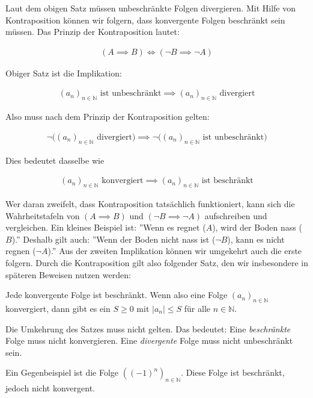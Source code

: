 \documentclass[fontsize=9pt,
               parskip=half-,
               DIV=14,
               listof=chapterentry,
               tocflat]{scrbook}
\begin{document}
Laut dem obigen Satz müssen unbeschränkte Folgen divergieren. Mit Hilfe von Kontraposition können wir folgern, dass konvergente Folgen beschränkt sein müssen. Das Prinzip der Kontraposition lautet:

\begin{align*}
(A\implies B)\iff (\neg B\implies \neg A)
\end{align*}

Obiger Satz ist die Implikation:

\begin{align*}
(a_{n})_{n\in \mathbb {N} }{\text{ ist unbeschränkt}}\implies (a_{n})_{n\in \mathbb {N} }{\text{ divergiert}}
\end{align*}

Also muss nach dem Prinzip der Kontraposition gelten:

\begin{align*}
\neg {\big (}(a_{n})_{n\in \mathbb {N} }{\text{ divergiert}}{\big )}\implies \neg {\big (}(a_{n})_{n\in \mathbb {N} }{\text{ ist unbeschränkt}}{\big )}
\end{align*}

Dies bedeutet dasselbe wie

\begin{align*}
(a_{n})_{n\in \mathbb {N} }{\text{ konvergiert}}\implies (a_{n})_{n\in \mathbb {N} }{\text{ ist beschränkt}}
\end{align*}

Wer daran zweifelt, dass Kontraposition tatsächlich funktioniert, kann sich die Wahrheitstafeln von $(A\implies B)$ und $(\neg B\implies \neg A)$ aufschreiben und vergleichen. Ein kleines Beispiel ist: {''}Wenn es regnet ($A$), wird der Boden nass ($B$).{''} Deshalb gilt auch: {''}Wenn der Boden nicht nass ist ($\neg B$), kann es nicht regnen ($\neg A$).{''} Aus der zweiten Implikation können wir umgekehrt auch die erste folgern. Durch die Kontraposition gilt also folgender Satz, den wir insbesondere in späteren Beweisen nutzen werden:

\begin{theorem*}
Jede konvergente Folge ist beschränkt. Wenn also eine Folge $(a_{n})_{n\in \mathbb {N} }$ konvergiert, dann gibt es ein $S\geq 0$ mit $|a_{n}|\leq S$ für alle $n\in \mathbb {N} $.

\end{theorem*}

\begin{hint*}
Die Umkehrung des Satzes muss nicht gelten. Das bedeutet: Eine \emph{beschränkte} Folge muss nicht konvergieren. Eine \emph{divergente} Folge muss nicht unbeschränkt sein.

Ein Gegenbeispiel ist die Folge $((-1)^{n})_{n\in \mathbb {N} }$. Diese Folge ist beschränkt, jedoch nicht konvergent.

\end{hint*}
\end{document}
